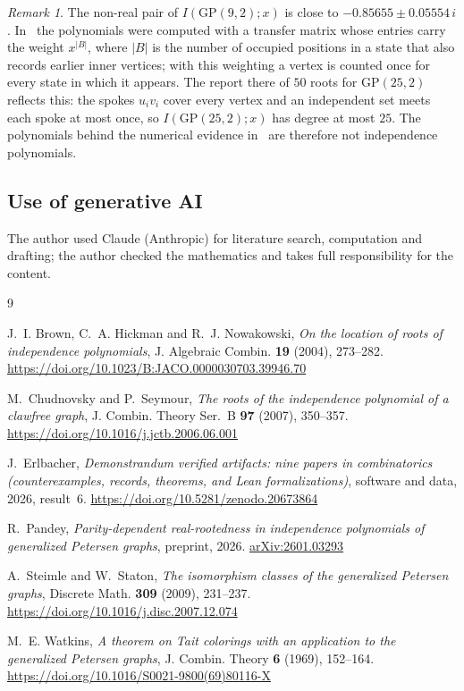 \documentclass[11pt]{amsart}
\theoremstyle{definition}
\theoremstyle{remark}
\newtheorem{remark}[theorem]{Remark}
\numberwithin{equation}{section}
\newcommand{\GP}{\mathrm{GP}}
\providecommand{\doi}[1]{\url{https://doi.org/#1}}
\begin{document}
\begin{remark}
The non-real pair of $I(\GP(9,2);x)$ is close to $-0.85655\pm0.05554\,i$. In~\cite{Pandey} the polynomials were computed with a transfer matrix whose entries carry the weight $x^{|B|}$, where $|B|$ is the number of occupied positions in a state that also records earlier inner vertices; with this weighting a vertex is counted once for every state in which it appears. The report there of $50$ roots for $\GP(25,2)$ reflects this: the spokes $u_iv_i$ cover every vertex and an independent set meets each spoke at most once, so $I(\GP(25,2);x)$ has degree at most $25$. The polynomials behind the numerical evidence in~\cite{Pandey} are therefore not independence polynomials.
\end{remark}

\subsection*{Use of generative AI} The author used Claude (Anthropic) for literature search, computation and drafting; the author checked the mathematics and takes full responsibility for the content.

\begin{thebibliography}{9}

J.~I. Brown, C.~A. Hickman and R.~J. Nowakowski, \emph{On the location of roots of independence polynomials}, J. Algebraic Combin. \textbf{19} (2004), 273--282. \doi{10.1023/B:JACO.0000030703.39946.70}

M.~Chudnovsky and P.~Seymour, \emph{The roots of the independence polynomial of a clawfree graph}, J. Combin. Theory Ser.~B \textbf{97} (2007), 350--357. \doi{10.1016/j.jctb.2006.06.001}

J.~Erlbacher, \emph{Demonstrandum verified artifacts: nine papers in combinatorics (counterexamples, records, theorems, and Lean formalizations)}, software and data, 2026, result~6. \doi{10.5281/zenodo.20673864}

R.~Pandey, \emph{Parity-dependent real-rootedness in independence polynomials of generalized Petersen graphs}, preprint, 2026. \href{https://arxiv.org/abs/2601.03293}{arXiv:2601.03293}

A.~Steimle and W.~Staton, \emph{The isomorphism classes of the generalized Petersen graphs}, Discrete Math. \textbf{309} (2009), 231--237. \doi{10.1016/j.disc.2007.12.074}

M.~E. Watkins, \emph{A theorem on Tait colorings with an application to the generalized Petersen graphs}, J. Combin. Theory \textbf{6} (1969), 152--164. \doi{10.1016/S0021-9800(69)80116-X}

\end{thebibliography}
\end{document}
